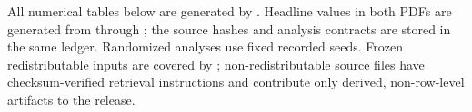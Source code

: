 \documentclass[11pt]{article}
\begin{document}
All numerical tables below are generated by
. Headline values in both PDFs are generated from
 through
; the source hashes and analysis contracts are stored
in the same ledger. Randomized analyses use fixed recorded seeds. Frozen redistributable
inputs are covered by ; non-redistributable source files have
checksum-verified retrieval instructions and contribute only derived, non-row-level
artifacts to the release.


\end{document}
